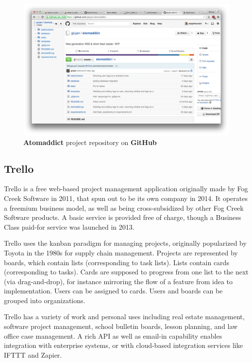\documentclass[12pt]{article}
\begin{document}
\begin{figure}[H]
    \centering
    \includegraphics[width=\textwidth]{images/github.png}
    \caption{\textbf{Atomaddict} project repository on \textbf{GitHub}}
    \label{fig:github}
\end{figure}


\subsection{Trello}
Trello is a free web-based project management application originally made by Fog Creek Software in 2011, that spun out to be its own company in 2014.
It operates a freemium business model, as well as being cross-subsidized by other Fog Creek Software products. A basic service is provided free of charge, though a Business Class paid-for service was launched in 2013.

Trello uses the kanban paradigm for managing projects, originally popularized by Toyota in the 1980s for supply chain management. Projects are represented by boards, which contain lists (corresponding to task lists). Lists contain cards (corresponding to tasks). Cards are supposed to progress from one list to the next (via drag-and-drop), for instance mirroring the flow of a feature from idea to implementation. Users can be assigned to cards. Users and boards can be grouped into organizations.

Trello has a variety of work and personal uses including real estate management, software project management, school bulletin boards, lesson planning, and law office case management. A rich API as well as email-in capability enables integration with enterprise systems, or with cloud-based integration services like IFTTT and Zapier.~\cite{wiki:trello}
\end{document}
